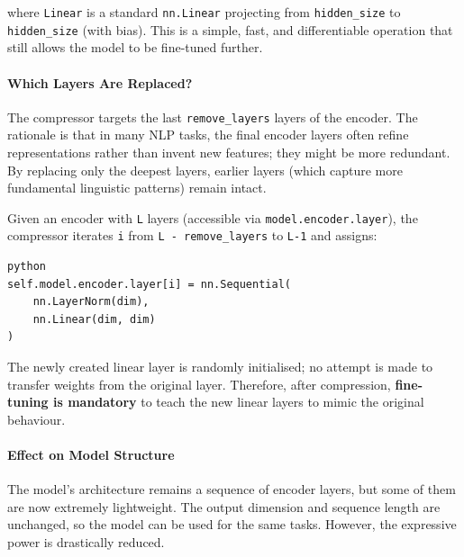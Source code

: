 where \texttt{Linear} is a standard \texttt{nn.Linear} projecting from \texttt{hidden\_size} to \texttt{hidden\_size} (with bias). This is a simple, fast, and differentiable operation that still allows the model to be fine-tuned further.

\paragraph{Which Layers Are Replaced?}

The compressor targets the last \texttt{remove\_layers} layers of the encoder. The rationale is that in many NLP tasks, the final encoder layers often refine representations rather than invent new features; they might be more redundant. By replacing only the deepest layers, earlier layers (which capture more fundamental linguistic patterns) remain intact.

Given an encoder with \texttt{L} layers (accessible via \texttt{model.encoder.layer}), the compressor iterates \texttt{i} from \texttt{L - remove\_layers} to \texttt{L-1} and assigns:

\vspace{0.5em}
\begin{mdframed}[backgroundcolor=codebg, linecolor=codeframe, linewidth=1pt, roundcorner=4pt, innerleftmargin=2pt, innerrightmargin=5pt, innertopmargin=5pt, innerbottommargin=5pt]
\begin{lstlisting}
python
self.model.encoder.layer[i] = nn.Sequential(
    nn.LayerNorm(dim),
    nn.Linear(dim, dim)
)
\end{lstlisting}
\end{mdframed}
\vspace{0.5em}

The newly created linear layer is randomly initialised; no attempt is made to transfer weights from the original layer. Therefore, after compression, \textbf{fine-tuning is mandatory} to teach the new linear layers to mimic the original behaviour.

\paragraph{Effect on Model Structure}

The model's architecture remains a sequence of encoder layers, but some of them are now extremely lightweight. The output dimension and sequence length are unchanged, so the model can be used for the same tasks. However, the expressive power is drastically reduced.


